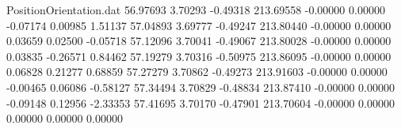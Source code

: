 \begin{filecontents}{PositionOrientation.dat}
  56.97693    3.70293   -0.49318   213.69558   -0.00000    0.00000   -0.07174    0.00985    1.51137
  57.04893    3.69777   -0.49247   213.80440   -0.00000    0.00000    0.03659    0.02500   -0.05718
  57.12096    3.70041   -0.49067   213.80028   -0.00000    0.00000    0.03835   -0.26571    0.84462
  57.19279    3.70316   -0.50975   213.86095   -0.00000    0.00000    0.06828    0.21277    0.68859
  57.27279    3.70862   -0.49273   213.91603   -0.00000    0.00000   -0.00465    0.06086   -0.58127
  57.34494    3.70829   -0.48834   213.87410   -0.00000    0.00000   -0.09148    0.12956   -2.33353
  57.41695    3.70170   -0.47901   213.70604   -0.00000    0.00000    0.00000    0.00000    0.00000
\end{filecontents}
